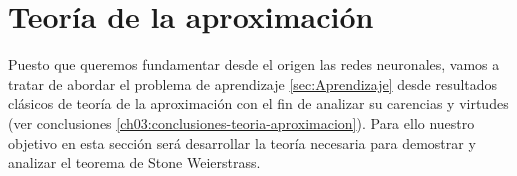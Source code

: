 
\chapter{Teoría de la aproximación}
 \label{ch03:teoria-aproximar}

 Puesto que queremos fundamentar desde el origen las redes neuronales,
vamos a tratar de abordar el problema de aprendizaje  \ref{sec:Aprendizaje} desde resultados clásicos de teoría de la aproximación con el fin de analizar su carencias y virtudes (ver conclusiones \ref{ch03:conclusiones-teoria-aproximacion}). Para ello nuestro objetivo en esta sección será desarrollar la teoría necesaria para demostrar y analizar el teorema de Stone Weierstrass. 






